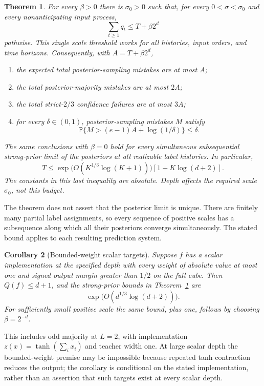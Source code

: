 \documentclass[11pt]{article}
\newtheorem{theorem}{Theorem}
\newtheorem{corollary}[theorem]{Corollary}
\newcommand{\Pp}{\mathbb P}
\begin{document}
\begin{theorem}\label{thm:main}
For every $\beta>0$ there is $\sigma_0>0$ such that, for every $0<\sigma<\sigma_0$ and every nonanticipating input process,
\begin{equation}\label{eq:main}
 \sum_{t\ge1}q_t\le T+\beta2^d
\end{equation}
pathwise. This single scale threshold works for all histories, input orders, and time horizons. Consequently, with $A=T+\beta2^d$,
\begin{enumerate}
\item the expected total posterior-sampling mistakes are at most $A$;
\item the total posterior-majority mistakes are at most $2A$;
\item the total strict-$2/3$ confidence failures are at most $3A$;
\item for every $\delta\in(0,1)$, posterior-sampling mistakes $M$ satisfy
\[
 \Pp\{M>(e-1)A+\log(1/\delta)\}\le\delta.
\]
\end{enumerate}
The same conclusions with $\beta=0$ hold for every simultaneous subsequential strong-prior limit of the posteriors at all realizable label histories. In particular,
\begin{equation}\label{eq:asymptotic}
 T\le \exp\bigl(O(K^{1/3}\log(K+1))\bigr)
       [1+K\log(d+2)].
\end{equation}
The constants in this last inequality are absolute. Depth affects the required scale $\sigma_0$, not this budget.
\end{theorem}

The theorem does not assert that the posterior limit is unique. There are finitely many partial label assignments, so every sequence of positive scales has a subsequence along which all their posteriors converge simultaneously. The stated bound applies to each resulting prediction system.

\begin{corollary}[Bounded-weight scalar targets]\label{cor:one}
Suppose $f$ has a scalar implementation at the specified depth with every weight of absolute value at most one and signed output margin greater than $1/2$ on the full cube. Then $Q(f)\le d+1$, and the strong-prior bounds in Theorem~\ref{thm:main} are
\[
 \exp\bigl(O(d^{1/3}\log(d+2))\bigr).
\]
For sufficiently small positive scale the same bound, plus one, follows by choosing $\beta=2^{-d}$.
\end{corollary}

This includes odd majority at $L=2$, with implementation $z(x)=\tanh(\sum_i x_i)$ and teacher width one. At large scalar depth the bounded-weight premise may be impossible because repeated tanh contraction reduces the output; the corollary is conditional on the stated implementation, rather than an assertion that such targets exist at every scalar depth.
\end{document}
